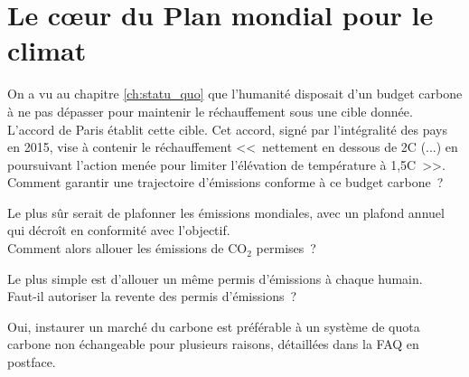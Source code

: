 \documentclass[a5paper,french]{memoir}
\begin{document}
\chapter{Le cœur du Plan mondial pour le climat\label{ch:coeur}}


On a vu au chapitre \ref{ch:statu_quo} que l'humanité disposait d'un budget carbone à ne pas dépasser pour maintenir le réchauffement sous une cible donnée. L'accord de Paris établit cette cible. Cet accord, signé par l'intégralité des pays en 2015,  vise à contenir le réchauffement <<~nettement en dessous de 2\textdegree{}C (...) en poursuivant l'action menée pour limiter l'élévation de température à 1,5\textdegree{}C~>>. \\

Comment garantir une trajectoire d'émissions conforme à ce budget carbone~? 

Le plus sûr serait de plafonner les émissions mondiales, avec un plafond annuel qui décroît en conformité avec l'objectif. \\

Comment alors allouer les émissions de CO$_\text{2}$ permises~? 

Le plus simple %
est d'allouer un même permis d'émissions à chaque humain. \\

Faut-il autoriser la revente des permis d'émissions~? 

Oui, %
instaurer un marché du carbone est préférable à un système de quota carbone non échangeable pour plusieurs raisons, détaillées dans la FAQ en postface. 
\end{document}
